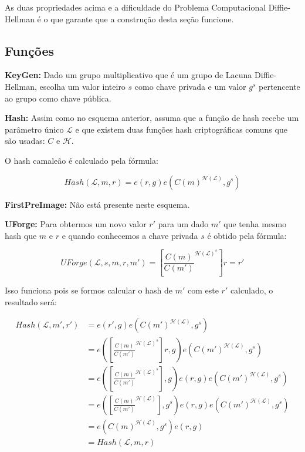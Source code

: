 \documentclass[a4paper]{article}
\begin{document}
As duas propriedades acima e a dificuldade do Problema Computacional
Diffie-Hellman é o que garante que a construção desta seção funcione.

\subsection{Funções}

\textbf{KeyGen: }Dado um grupo multiplicativo que é um grupo de Lacuna
Diffie-Hellman, escolha um valor inteiro $s$ como chave privada e um
valor $g^s$ pertencente ao grupo como chave pública.

\textbf{Hash: } Assim como no esquema anterior, assuma que a função de
hash recebe um parâmetro único $\mathcal{L}$ e que existem duas
funções hash criptográficas comuns que são usadas: $C$ e
$\mathcal{H}$.

O hash camaleão é calculado  pela fórmula:

$$
Hash(\mathcal{L}, m, r) = e(r, g)e(C(m)^{\mathcal{H}(\mathcal{L})}, g^s)
$$

\textbf{FirstPreImage:} Não está presente neste esquema.

\textbf{UForge:} Para obtermos um novo valor $r'$ para um dado $m'$
que tenha mesmo hash que $m$ e $r$ e quando conhecemos a chave privada
$s$ é obtido pela fórmula:

$$
UForge(\mathcal{L}, s, m, r, m') = \left[\frac{C(m)}{C(m')}^{\mathcal{H}(\mathcal{L})^s}\right]r = r'
$$

Isso funciona pois se formos calcular o hash de $m'$ com este $r'$
calculado, o resultado será:

\begin{equation}
\begin{split}
  Hash(\mathcal{L}, m', r') &= e(r', g)e(C(m')^{\mathcal{H}(\mathcal{L})}, g^s)\\
  &= e(\left[\frac{C(m)}{C(m')}^{\mathcal{H}(\mathcal{L})^s}\right]r, g)e(C(m')^{\mathcal{H}(\mathcal{L})}, g^s)\\
  &=e(\left[\frac{C(m)}{C(m')}^{\mathcal{H}(\mathcal{L})^s}\right], g)e(r, g)e(C(m')^{\mathcal{H}(\mathcal{L})}, g^s)\\
  &=e(\left[\frac{C(m)}{C(m')}^{\mathcal{H}(\mathcal{L})}\right], g^s)e(r, g)e(C(m')^{\mathcal{H}(\mathcal{L})}, g^s)\\
  &=e(C(m)^{\mathcal{H}(\mathcal{L})}, g^s)e(r, g)\\
  &= Hash(\mathcal{L}, m, r)\\
\end{split}
\end{equation}
\end{document}
